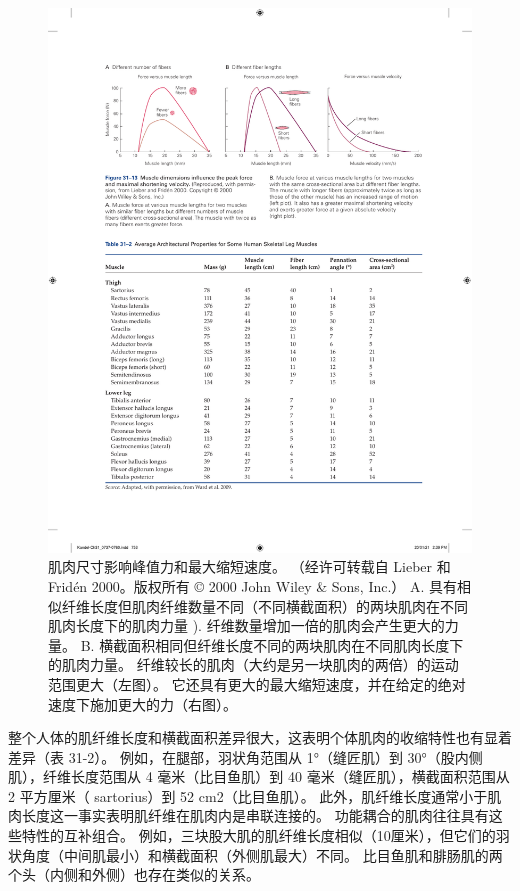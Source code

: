 \begin{figure}[htbp]
	\centering
	\includegraphics[width=0.9\linewidth]{chap31/fig_31_13}
	\caption{肌肉尺寸影响峰值力和最大缩短速度。 （经许可转载自 Lieber 和 Fridén 2000。版权所有 © 2000 John Wiley \& Sons, Inc.） A. 具有相似纤维长度但肌肉纤维数量不同（不同横截面积）的两块肌肉在不同肌肉长度下的肌肉力量 ). 纤维数量增加一倍的肌肉会产生更大的力量。 B. 横截面积相同但纤维长度不同的两块肌肉在不同肌肉长度下的肌肉力量。 纤维较长的肌肉（大约是另一块肌肉的两倍）的运动范围更大（左图）。 它还具有更大的最大缩短速度，并在给定的绝对速度下施加更大的力（右图）。}
	\label{fig:31_13}
\end{figure}


整个人体的肌纤维长度和横截面积差异很大，这表明个体肌肉的收缩特性也有显着差异（表 31-2）。
例如，在腿部，羽状角范围从 1°（缝匠肌）到 30°（股内侧肌），纤维长度范围从 4 毫米（比目鱼肌）到 40 毫米（缝匠肌），横截面积范围从 2 平方厘米（ sartorius）到 52 cm2（比目鱼肌）。
此外，肌纤维长度通常小于肌肉长度这一事实表明肌纤维在肌肉内是串联连接的。
功能耦合的肌肉往往具有这些特性的互补组合。
例如，三块股大肌的肌纤维长度相似（10厘米），但它们的羽状角度（中间肌最小）和横截面积（外侧肌最大）不同。
比目鱼肌和腓肠肌的两个头（内侧和外侧）也存在类似的关系。


